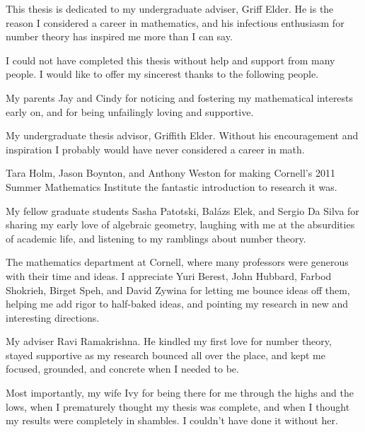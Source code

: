 \documentclass[phd,cornellheadings,tocprelim]{cornell}
\begin{document}
\begin{dedication}
This thesis is dedicated to my undergraduate adviser, Griff Elder. He is the 
reason I considered a career in mathematics, and his infectious enthusiasm 
for number theory has inspired me more than I can say. 
\end{dedication}

\begin{acknowledgements}
I could not have completed this thesis without help and support from many 
people. I would like to offer my sincerest thanks to the following people. 

My parents Jay and Cindy for noticing and fostering my mathematical 
interests early on, and for being unfailingly loving and supportive. 

My undergraduate thesis advisor, Griffith Elder. Without his encouragement 
and inspiration I probably would have never considered a career in math. 

Tara Holm, Jason Boynton, and Anthony Weston for making Cornell's 2011 Summer 
Mathematics Institute the fantastic introduction to research it was. 

My fellow graduate students Sasha Patotski, Bal\'azs Elek, and Sergio Da 
Silva for sharing my early love of algebraic geometry, laughing with me at the 
absurdities of academic life, and listening to my ramblings about number theory. 

The mathematics department at Cornell, where many professors were generous 
with their time and ideas. I appreciate Yuri Berest, John Hubbard, Farbod 
Shokrieh, Birget Speh, and David Zywina for letting me bounce ideas off them, 
helping me add rigor to half-baked ideas, and pointing my research in new and 
interesting directions. 

My adviser Ravi Ramakrishna. He kindled my first love for number theory, 
stayed supportive as my research bounced all over the place, and kept me 
focused, grounded, and concrete when I needed to be. 

Most importantly, my wife Ivy for being there for me through the highs 
and the lows, when I prematurely thought my thesis was complete, and when I 
thought my results were completely in shambles. I couldn't have done it without 
her. 
\end{acknowledgements}

\contentspage

\normalspacing
\setcounter{page}{1}
\pagestyle{cornell}
\addtolength{\parskip}{0.5\baselineskip}










\end{document}
